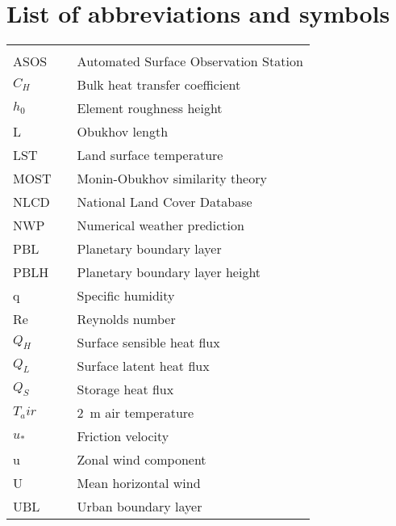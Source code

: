 \newpage
{}
\listoffigures
\cleardoublepage

\chapter*{List of abbreviations and symbols}

\begin{center}
  \begin{tabular}{lll}
    \hspace*{2em} & \hspace*{1in} & \hspace*{4.5in} \\
    ASOS  & \dotfill & Automated Surface Observation Station \\
    $C_H$  & \dotfill & Bulk heat transfer coefficient \\
    $h_0$  & \dotfill & Element roughness height \\
    L & \dotfill & Obukhov length \\
    LST  & \dotfill & Land surface temperature \\
    MOST  & \dotfill & Monin-Obukhov similarity theory \\
    NLCD  & \dotfill & National Land Cover Database \\
    NWP  & \dotfill & Numerical weather prediction \\
    PBL  & \dotfill & Planetary boundary layer \\
    PBLH  & \dotfill & Planetary boundary layer height \\
    q & \dotfill & Specific humidity \\
    Re  & \dotfill & Reynolds number \\
    $Q_H$  & \dotfill & Surface sensible heat flux \\
    $Q_L$  & \dotfill & Surface latent heat flux \\
    $Q_S$  & \dotfill & Storage heat flux \\
    $T_air$  & \dotfill & \SI{2}{\meter} air temperature \\
    $u_*$ & \dotfill & Friction velocity \\
    u & \dotfill & Zonal wind component \\
    U & \dotfill & Mean horizontal wind \\
    UBL  & \dotfill & Urban boundary layer \\

\end{tabular}
\end{center}
